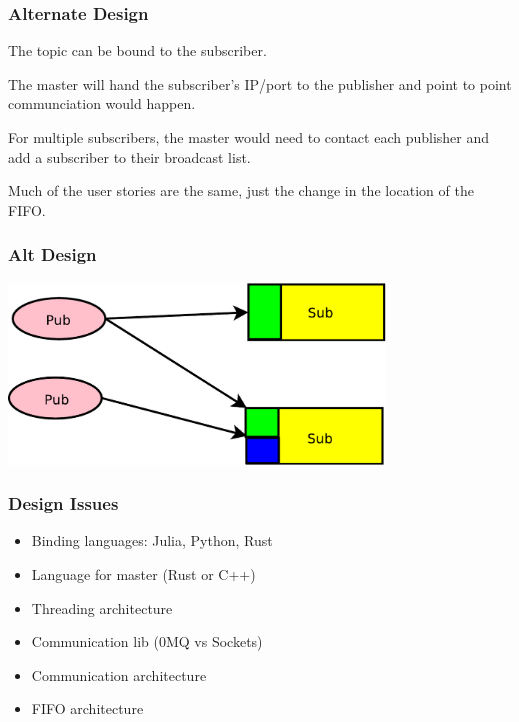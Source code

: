 \documentclass[xcolor=svgnames]{beamer}
\begin{document}
\begin{frame}[fragile]
  \frametitle{Alternate Design}

The topic can be bound to the subscriber.
\vfill

The master will hand the subscriber's IP/port to the publisher and point to point communciation would happen. \vfill

   For multiple subscribers, the master would need to contact each publisher and add a subscriber to their broadcast list.\vfill
   
Much of the user stories are the same, just the change in the location of the FIFO.

\end{frame}


\begin{frame}[fragile]
  \frametitle{Alt Design}
\begin{center}
\includegraphics[width=10cm]{./Diagram15.pdf}
\end{center}
\end{frame}




\begin{frame}[fragile]
  \frametitle{Design Issues}

\begin{itemize}
\item Binding languages:  Julia, Python, Rust
\item Language for master (Rust or C++)
\item Threading architecture
\item Communication lib (0MQ vs Sockets)
\item Communication architecture
\item FIFO architecture
\end{itemize}

\end{frame}
\end{document}
